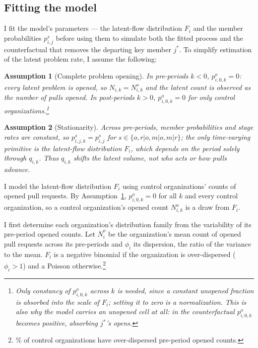 \documentclass[12pt,notitlepage]{article}
\newtheorem{assumption}{Assumption}
\begin{document}
\subsection{Fitting the model}
\label{sec:fitting}
I fit the model's parameters --- the latent-flow distribution $F_i$ and the member probabilities $p_{i,j}^s$ before using them to simulate both the fitted process and the counterfactual that removes the departing key member $j^*$.
To simplify estimation of the latent problem rate, I assume the following:

\begin{assumption}[Complete problem opening]
\label{asm:complete-opening}
In pre-periods $k<0$, $p_{i,0,k}^o = 0$: every latent problem is opened, so $N_{i,k} = N_{i,k}^o$ and the latent count is observed as the number of pulls opened. In post-periods $k>0$, $p_{i,0,k}^o = 0$ for only control organizations.\footnote{Only constancy of $p_{i,0,k}^o$ across $k$ is needed, since a constant unopened fraction is absorbed into the scale of $F_i$; setting it to zero is a normalization. This is also why the model carries an unopened cell at all: in the counterfactual $p_{i,0,k}^o$ becomes positive, absorbing $j^*$'s opens.}
\end{assumption}

\begin{assumption}[Stationarity]
\label{asm:stationary}
Across pre-periods, member probabilities and stage rates are constant, so $p_{i,j,k}^s = p_{i,j}^s$ for $s\in\{o,r|o,m|o,m|r\}$; the only time-varying primitive is the latent-flow distribution $F_i$, which depends on the period solely through $q_{i,k}$.
Thus $q_{i,k}$ shifts the latent \emph{volume}, not who acts or how pulls advance.
\end{assumption}

I model the latent-flow distribution $F_i$ using control organizations' counts of opened pull requests.
By Assumption~\ref{asm:complete-opening}, $p_{i,0,k}^o=0$ for all $k$ and every control organization, so a control organization's opened count $N_{i,k}^o$ is a draw from $F_i$.

I first determine each organization's distribution family from the variability of its pre-period opened counts.
Let $\overline{N}_i^o$ be the organization's mean count of opened pull requests across its \NumPostPeriodWord{} pre-periods and $\phi_i$ its dispersion, the ratio of the variance to the mean.
$F_i$ is a negative binomial if the organization is over-dispersed ($\phi_i>1$) and a Poisson otherwise.\footnote{\PctOrgsOverdispersed\% of control organizations have over-dispersed pre-period opened counts.}
\end{document}
